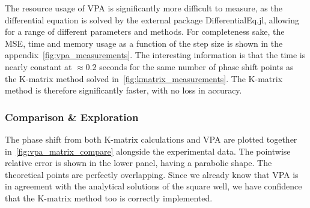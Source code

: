 The resource usage of VPA is significantly more difficult to measure, as the
differential equation is solved by the external package
\textrm{DifferentialEq.jl}, allowing for a range of different parameters and
methods. For completeness sake, the MSE, time and memory usage as a function of
the step size is shown in the appendix~\cref{fig:vpa_measurements}. The
interesting information is that the time is nearly constant at \(\approx 0.2\)
seconds for the same number of phase shift points as the K-matrix method solved
in~\cref{fig:kmatrix_measurements}. The K-matrix method is therefore
significantly faster, with no loss in accuracy.


\subsubsection{Comparison \& Exploration}

The phase shift from both K-matrix calculations and VPA are plotted together
in~\cref{fig:vpa_matrix_compare} alongside the experimental data. The pointwise
relative error is shown in the lower panel, having a parabolic shape. The
theoretical points are perfectly overlapping. Since we already know that VPA
is in agreement with the analytical solutions of the square well, we have
confidence that the K-matrix method too is correctly implemented.


